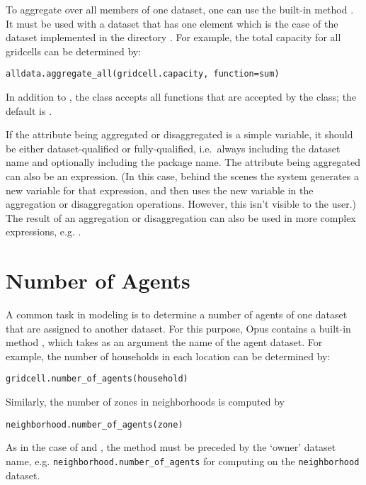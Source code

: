To aggregate over all members of one dataset, \datasetindex one can use the
built-in method . It must be used with a dataset
\datasetindex that has one element which is the case of the
 dataset \datasetindex {}
implemented in the directory . For example, the total
capacity for all gridcells can be determined by:
\begin{verbatim}
alldata.aggregate_all(gridcell.capacity, function=sum)
\end{verbatim}
In addition to , the  class accepts all
functions that are accepted by the  class;
the default is .

If the attribute being aggregated or disaggregated is a simple variable, it
should be either dataset-qualified or fully-qualified, i.e.\ always
including the dataset name and optionally including the package name.  The
attribute being aggregated can also be an expression.  (In this case,
behind the scenes the system generates a new variable for that expression,
and then uses the new variable in the aggregation or disaggregation
operations.  However, this isn't visible to the user.)  The result of an
aggregation or disaggregation can also be used in more complex expressions,
e.g. .

\section{Number of Agents}

A common task in modeling is to determine a number of agents of one dataset
\datasetindex that are assigned to another dataset. \datasetindex For this
purpose, Opus contains a built-in method , which
takes as an argument the name of the agent dataset.  For example,
the number of households in each location can be determined by:
\variablesindex \attributesindex
\begin{verbatim}
gridcell.number_of_agents(household)
\end{verbatim}

Similarly, the number of zones in neighborhoods is computed by
\begin{verbatim}
neighborhood.number_of_agents(zone)
\end{verbatim}

As in the case of  and , the
 method must be preceded by the `owner' dataset
name, e.g. \verb|neighborhood.number_of_agents| for computing on the
\verb|neighborhood| dataset.

